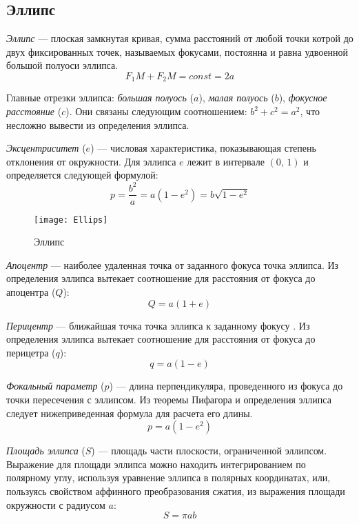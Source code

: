 \subsection{Эллипс}
\textit{Эллипс} --- плоская замкнутая кривая, сумма 
расстояний от любой точки котрой до двух фиксированных 
точек, называемых фокусами, постоянна и равна 
удвоенной большой полуоси эллипса.
\begin{equation}F_1M+F_2M=const=2a
\end{equation}

Главные отрезки эллипса: {\itshape большая полуось} 
($a$), {\itshape малая полуось} ($b$), {\itshape 
фокусное расстояние} ($c$). Они связаны следующим 
соотношением: $b^2+c^2=a^2$, что несложно вывести из 
определения эллипса.

{\itshape Эксцентриситет} ($e$) --- числовая 
характеристика, показывающая степень отклонения от 
окружности. Для эллипса $e$ лежит в интервале $(0, \, 1)$ и
определяется следующей формулой:\begin{equation}
p=\frac{b^2}{a}=a(1-e^2)=b\sqrt{1-e^2}
\end{equation}

\begin{figure}[h!]
\centering
\texttt{[image: Ellips]}
\caption{Эллипс}
\end{figure}

{\itshape Апоцентр} --- наиболее удаленная точка
от заданного фокуса точка эллипса. Из определения эллипса
вытекает соотношение для расстояния от фокуса до 
апоцентра ($Q$):\begin{equation}
Q = a (1 + e)
\end{equation}

{\itshape Перицентр} --- ближайшая точка
точка эллипса к заданному фокусу . Из определения эллипса
вытекает соотношение для расстояния от фокуса до 
перицетра ($q$):\begin{equation}
q = a (1 - e)
\end{equation}

{\itshape Фокальный параметр} ($p$) --- длина перпендикуляра,
проведенного из фокуса до точки пересечения с эллипсом.
Из теоремы Пифагора и определения эллипса следует 
нижеприведенная формула для расчета его длины. 
\begin{equation}
p = a(1 - e^2)
\end{equation}

{\itshape Площадь эллипса} ($S$) --- площадь части 
плоскости, ограниченной эллипсом. Выражение для площади 
эллипса можно находить интегрированием по полярному углу, 
используя уравнение эллипса в полярных координатах, или, 
пользуясь свойством аффинного преобразования сжатия, из 
выражения площади окружности с радиусом $a$:
\begin{equation}
S=\pi ab
\end{equation}


